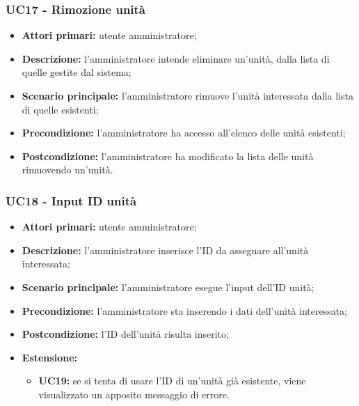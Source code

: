 \subsubsection{UC17 - Rimozione unità}
	\begin{itemize}
		\item \textbf{Attori primari:} utente amministratore;
		\item \textbf{Descrizione:} l'amministratore intende eliminare un'unità, dalla lista di quelle gestite dal sistema;
		\item \textbf{Scenario principale:} l'amministratore rimuove l'unità interessata dalla lista di quelle esistenti;
		\item \textbf{Precondizione:} l'amministratore ha accesso all'elenco delle unità esistenti;
		\item \textbf{Postcondizione:} l'amministratore ha modificato la lista delle unità rimuovendo un'unità.
	\end{itemize}

\subsubsection{UC18 - Input ID unità}
	\begin{itemize}
		\item \textbf{Attori primari:} utente amministratore;
		\item \textbf{Descrizione:} l'amministratore inserisce l'ID da assegnare all'unità interessata;
		\item \textbf{Scenario principale:} l'amministratore esegue l'input dell'ID unità;
		\item \textbf{Precondizione:} l'amministratore sta inserendo i dati dell'unità interessata;
		\item \textbf{Postcondizione:} l'ID dell'unità risulta inserito;
		\item \textbf{Estensione:}
		\begin{itemize}
			\item \textbf{UC19:} se si tenta di usare l'ID di un'unità già esistente, viene visualizzato un apposito messaggio di errore.
		\end{itemize}
	\end{itemize}

